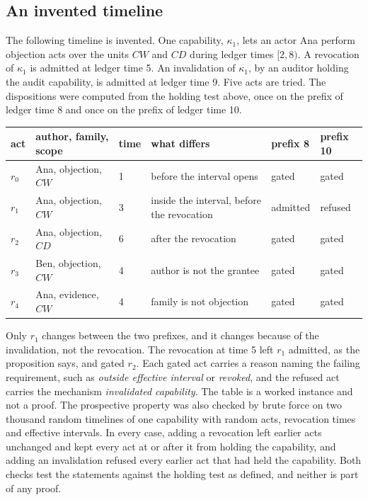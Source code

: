 \documentclass[11pt]{article}
\begin{document}
\subsection{An invented timeline}

The following timeline is invented. One capability, $\kappa_1$, lets an actor Ana perform objection acts over the units $CW$ and $CD$ during ledger times $[2,8)$. A revocation of $\kappa_1$ is admitted at ledger time 5. An invalidation of $\kappa_1$, by an auditor holding the audit capability, is admitted at ledger time 9. Five acts are tried. The dispositions were computed from the holding test above, once on the prefix of ledger time 8 and once on the prefix of ledger time 10.

\begin{center}
\small
\begin{tabularx}{\textwidth}{@{}l l l X l l@{}}
\toprule
act & author, family, scope & time & what differs & prefix 8 & prefix 10\\
\midrule
$r_0$ & Ana, objection, $CW$ & 1 & before the interval opens & gated & gated\\
$r_1$ & Ana, objection, $CW$ & 3 & inside the interval, before the revocation & admitted & refused\\
$r_2$ & Ana, objection, $CD$ & 6 & after the revocation & gated & gated\\
$r_3$ & Ben, objection, $CW$ & 4 & author is not the grantee & gated & gated\\
$r_4$ & Ana, evidence, $CW$ & 4 & family is not objection & gated & gated\\
\bottomrule
\end{tabularx}
\end{center}

Only $r_1$ changes between the two prefixes, and it changes because of the invalidation, not the revocation. The revocation at time 5 left $r_1$ admitted, as the proposition says, and gated $r_2$. Each gated act carries a reason naming the failing requirement, such as \emph{outside effective interval} or \emph{revoked}, and the refused act carries the mechanism \emph{invalidated capability}. The table is a worked instance and not a proof. The prospective property was also checked by brute force on two thousand random timelines of one capability with random acts, revocation times and effective intervals. In every case, adding a revocation left earlier acts unchanged and kept every act at or after it from holding the capability, and adding an invalidation refused every earlier act that had held the capability. Both checks test the statements against the holding test as defined, and neither is part of any proof.
\end{document}
